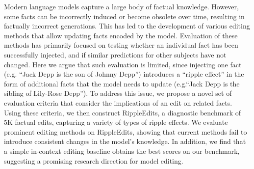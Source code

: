 Modern language models capture a large body of factual knowledge. However, some facts can be incorrectly induced or become obsolete over time, resulting in factually incorrect generations. This has led to the development of various editing methods that allow updating facts encoded by the model. Evaluation of these methods has primarily focused on testing whether an individual fact has been successfully injected, and if similar predictions for other subjects have not changed. Here we argue that such evaluation is limited, since injecting one fact (e.g. ``Jack Depp is the son of Johnny Depp'') introduces a ``ripple effect'' in the form of additional facts that the model needs to update (e.g.``Jack Depp is the sibling of Lily-Rose Depp''). To address this issue, we propose a novel set of evaluation criteria that consider the implications of an edit on related facts. Using these criteria, we then construct RippleEdits, a diagnostic benchmark of 5K factual edits, capturing a variety of types of ripple effects. We evaluate prominent editing methods on RippleEdits, showing that current methods fail to introduce consistent changes in the model's knowledge. In addition, we find that a simple in-context editing baseline obtains the best scores on our benchmark, suggesting a promising research direction for model editing.